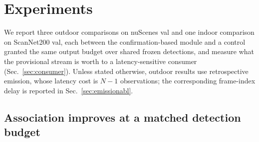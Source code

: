 \section{Experiments}
\label{sec:exp}

We report three outdoor comparisons on nuScenes val and one indoor comparison
on ScanNet200 val, each between the confirmation-based module and a control
granted the same output budget over shared frozen detections, and measure what
the provisional stream is worth to a latency-sensitive consumer
(Sec.~\ref{sec:consumer}). Unless stated
otherwise, outdoor results use retrospective emission, whose latency cost is
$N{-}1$ observations; the corresponding frame-index delay is reported in
Sec.~\ref{sec:emissionabl}.

\subsection{Association improves at a matched detection budget}
\label{sec:detmatch}



